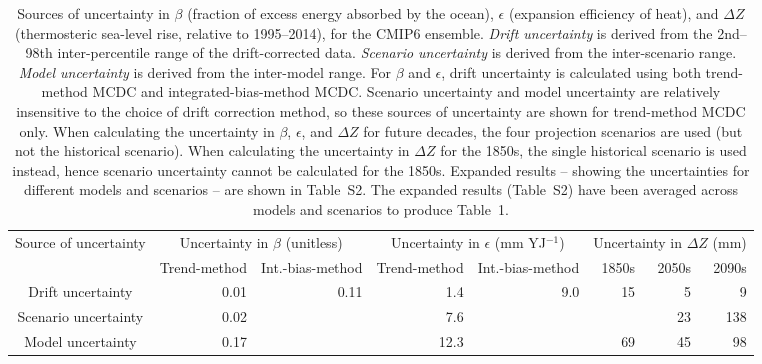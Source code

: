 \begin{table*}[t]
\centering
\caption{Sources of uncertainty in $\beta$ (fraction of excess energy absorbed by the ocean), $\epsilon$ (expansion efficiency of heat), and ${\Delta}Z$ (thermosteric sea-level rise, relative to 1995--2014), for the CMIP6 ensemble. \emph{Drift uncertainty} is derived from the 2nd--98th inter-percentile range of the drift-corrected data. \emph{Scenario uncertainty} is derived from the inter-scenario range. \emph{Model uncertainty} is derived from the inter-model range. For $\beta$ and $\epsilon$, drift uncertainty is calculated using both trend-method MCDC and integrated-bias-method MCDC. Scenario uncertainty and model uncertainty are relatively insensitive to the choice of drift correction method, so these sources of uncertainty are shown for trend-method MCDC only. When calculating the uncertainty in $\beta$, $\epsilon$, and ${\Delta}Z$ for future decades, the four projection scenarios are used (but not the historical scenario). When calculating the uncertainty in ${\Delta}Z$ for the 1850s, the single historical scenario is used instead, hence scenario uncertainty cannot be calculated for the 1850s. Expanded results -- showing the uncertainties for different models and scenarios -- are shown in Table~S2. The expanded results (Table~S2) have been averaged across models and scenarios to produce Table~1.}
\begin{tabular}{c|rr|rr|rrr}
\toprule
Source of uncertainty & \multicolumn{2}{c|}{Uncertainty in $\beta$ (unitless)} & \multicolumn{2}{c|}{Uncertainty in $\epsilon$ (mm YJ$^{-1}$)} & \multicolumn{3}{c}{Uncertainty in ${\Delta}Z$ (mm)} \\
 & Trend-method & Int.-bias-method & Trend-method & Int.-bias-method & 1850s & 2050s & 2090s \\
\midrule
Drift uncertainty & 0.01 & 0.11 & 1.4 & 9.0 & 15 & 5 & 9 \\
Scenario uncertainty & 0.02 &  & 7.6 &  &  & 23 & 138 \\
Model uncertainty & 0.17 &  & 12.3 &  & 69 & 45 & 98 \\
\bottomrule
\end{tabular}
\end{table*}
